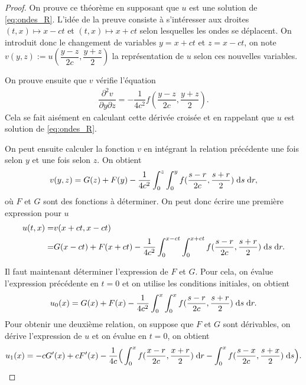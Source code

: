 \documentclass[12pt,a4paper,twoside]{article}
\begin{document}
\begin{proof}
  On prouve ce th\'eor\`eme en supposant que $u$ est une solution de \eqref{eq:ondes_R}.
  L'id\'ee de la preuve consiste \`a s'int\'eresser aux droites $(t,x) \mapsto x-ct$
  et $(t,x) \mapsto x+ct$ selon lesquelles les ondes se d\'eplacent.
  On introduit donc le changement de variables $y = x+ct$ et $z = x-ct$,
  on note $v(y,z) := u(\dfrac{y-z}{2c} , \dfrac{y+z}{2})$ la repr\'esentation
  de $u$ selon ces nouvelles variables.

  On prouve ensuite que $v$ v\'erifie l'\'equation
  \begin{align*}
    \dfrac{\partial^2 v}{\partial y \partial z} = - \dfrac{1}{4 c^2} f (\dfrac{y-z}{2c} , \dfrac{y+z}{2}) .
  \end{align*}
  Cela se fait ais\'ement en calculant cette d\'eriv\'ee crois\'ee et en rappelant que $u$ 
  est solution de \eqref{eq:ondes_R}.

  On peut ensuite calculer la fonction $v$ en int\'egrant la relation pr\'ec\'edente
  une fois selon $y$ et une fois selon $z$.
  On obtient
  \begin{align*}
    v(y,z) = G(z) + F(y) - \dfrac{1}{4c^2} \int_0^z \int_0^y f(\dfrac{s-r}{2c} , \dfrac{s+r}{2})
    \;\mathrm{d} s \;\mathrm{d} r ,
  \end{align*}
  o\`u $F$ et $G$ sont des fonctions \`a d\'eterminer.
  On peut donc \'ecrire une premi\`ere expression pour $u$
  \begin{align*}
    u(t,x) 
    =& v(x+ct,x-ct)
    \\
    =& G(x-ct) + F(x+ct) - \dfrac{1}{4c^2} \int_{0}^{x-ct} \int_0^{x+ct} f(\dfrac{s-r}{2c} , \dfrac{s+r}{2}) 
       \;\mathrm{d} s \;\mathrm{d} r .
  \end{align*}

  Il faut maintenant d\'eterminer l'expression de $F$ et $G$.
  Pour cela, on \'evalue l'expression pr\'ec\'edente en $t=0$ et on utilise
  les conditions initiales, on obtient
  \begin{align}
    \label{eq:proof_DAlembert_u0}
    u_0(x) = G(x) + F(x) - \dfrac{1}{4c^2} \int_{0}^{x} \int_0^{x} f(\dfrac{s-r}{2c} , \dfrac{s+r}{2})
    \;\mathrm{d} s \;\mathrm{d} r .
  \end{align}
  Pour obtenir une deuxi\`eme relation, on suppose que $F$ et $G$ sont
  d\'erivables, on d\'erive l'expression de $u$ et on \'evalue en $t=0$,
  on obtient
  \begin{align}
    \label{eq:proof_DAlembert_u1}
    u_1(x) = - c G'(x) + c F'(x) - \dfrac{1}{4c} \Big( 
    \int_{0}^x f(\dfrac{x-r}{2c},\dfrac{x+r}{2}) \;\mathrm{d} r
    - \int_0^x f(\dfrac{s-x}{2c},\dfrac{s+x}{2}) \;\mathrm{d} s
    \Big) .
  \end{align}


\end{proof}
\end{document}
